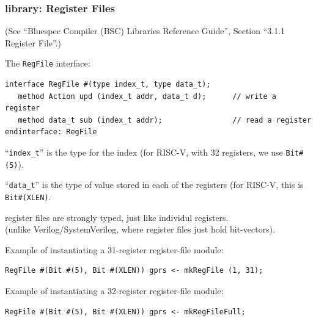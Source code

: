 
\begin{frame}[fragile]
\frametitle{{\BSV} library: Register Files}

\footnotesize

(See ``Bluespec Compiler (BSC) Libraries Reference Guide'', Section ``3.1.1 Register File''.)

\vspace{2ex}

The {\tt RegFile} interface:

\begin{Verbatim}[frame=single]
interface RegFile #(type index_t, type data_t);
   method Action upd (index_t addr, data_t d);      // write a register
   method data_t sub (index_t addr);                // read a register
endinterface: RegFile
\end{Verbatim}

\vspace{2ex}

``\verb|index_t|'' is the type for the index (for RISC-V, with 32
registers, we use \verb|Bit#(5)|).

``\verb|data_t|'' is the type of value stored in each of the
registers (for RISC-V, this is \verb|Bit#(XLEN)|.

\vspace{1ex}

{\BSV} register files are strongly typed, just like individul registers. \\
(unlike Verilog/SystemVerilog, where register files just hold bit-vectors).

\vspace{2ex}

Example of instantiating a 31-register register-file module:

\begin{Verbatim}[frame=single]
RegFile #(Bit #(5), Bit #(XLEN)) gprs <- mkRegFile (1, 31);
\end{Verbatim}

Example of instantiating a 32-register register-file module:

\begin{Verbatim}[frame=single]
RegFile #(Bit #(5), Bit #(XLEN)) gprs <- mkRegFileFull;
\end{Verbatim}

\end{frame}


